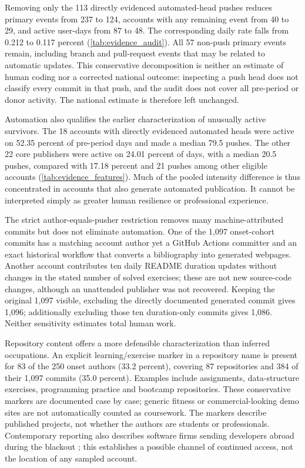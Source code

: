 

Removing only the 113 directly evidenced automated-head pushes reduces primary events from 237 to 124, accounts with any remaining event from 40 to 29, and active user-days from 87 to 48. The corresponding daily rate falls from 0.212 to 0.117 percent (\cref{tab:evidence_audit}). All 57 non-push primary events remain, including branch and pull-request events that may be related to automatic updates. This conservative decomposition is neither an estimate of human coding nor a corrected national outcome: inspecting a push head does not classify every commit in that push, and the audit does not cover all pre-period or donor activity. The national estimate is therefore left unchanged.

Automation also qualifies the earlier characterization of unusually active survivors. The 18 accounts with directly evidenced automated heads were active on 52.35 percent of pre-period days and made a median 79.5 pushes. The other 22 core publishers were active on 24.01 percent of days, with a median 20.5 pushes, compared with 17.18 percent and 21 pushes among other eligible accounts (\cref{tab:evidence_features}). Much of the pooled intensity difference is thus concentrated in accounts that also generate automated publication. It cannot be interpreted simply as greater human resilience or professional experience.

The strict author-equals-pusher restriction removes many machine-attributed commits but does not eliminate automation. One of the 1,097 onset-cohort commits has a matching account author yet a GitHub Actions committer and an exact historical workflow that converts a bibliography into generated webpages. Another account contributes ten daily README duration updates without changes in the stated number of solved exercises; these are not new source-code changes, although an unattended publisher was not recovered. Keeping the original 1,097 visible, excluding the directly documented generated commit gives 1,096; additionally excluding those ten duration-only commits gives 1,086. Neither sensitivity estimates total human work.

Repository content offers a more defensible characterization than inferred occupations. An explicit learning/exercise marker in a repository name is present for 83 of the 250 onset authors (33.2 percent), covering 87 repositories and 384 of their 1,097 commits (35.0 percent). Examples include assignments, data-structure exercises, programming practice and bootcamp repositories. These conservative markers are documented case by case; generic fitness or commercial-looking demo sites are not automatically counted as coursework. The markers describe published projects, not whether the authors are students or professionals. Contemporary reporting also describes software firms sending developers abroad during the blackout \citep{moli2024}; this establishes a possible channel of continued access, not the location of any sampled account.
